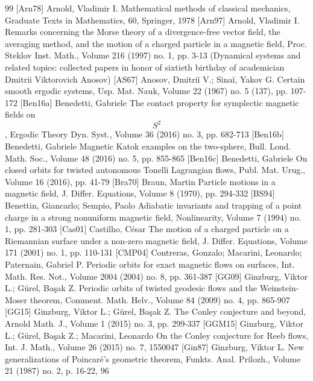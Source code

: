 \documentclass[10pt]{amsart}
\theoremstyle{definition}
\begin{document}
\begin{thebibliography}{99}
 [Arn78] Arnold, Vladimir I. Mathematical methods of classical mechanics, Graduate Texts in Mathematics, 60, Springer, 1978
 [Arn97] Arnold, Vladimir I. Remarks concerning the Morse theory of a divergence-free vector field, the averaging method, and the motion of a charged particle in a magnetic field, Proc. Steklov Inst. Math., Volume 216 (1997) no. 1, pp. 3-13 (Dynamical systems and related topics: collected papers in honor of sixtieth birthday of academician Dmitrii Viktorovich Anosov)
 [AS67] Anosov, Dmitriĭ V.; Sinaĭ, Yakov G. Certain smooth ergodic systems, Usp. Mat. Nauk, Volume 22 (1967) no. 5 (137), pp. 107-172
 [Ben16a] Benedetti, Gabriele The contact property for symplectic magnetic fields on $${S}^2$$, Ergodic Theory Dyn. Syst., Volume 36 (2016) no. 3, pp. 682-713
 [Ben16b] Benedetti, Gabriele Magnetic Katok examples on the two-sphere, Bull. Lond. Math. Soc., Volume 48 (2016) no. 5, pp. 855-865
 [Ben16c] Benedetti, Gabriele On closed orbits for twisted autonomous Tonelli Lagrangian flows, Publ. Mat. Urug., Volume 16 (2016), pp. 41-79
 [Bra70] Braun, Martin Particle motions in a magnetic field, J. Differ. Equations, Volume 8 (1970), pp. 294-332
 [BS94] Benettin, Giancarlo; Sempio, Paolo Adiabatic invariants and trapping of a point charge in a strong nonuniform magnetic field, Nonlinearity, Volume 7 (1994) no. 1, pp. 281-303
 [Cas01] Castilho, César The motion of a charged particle on a Riemannian surface under a non-zero magnetic field, J. Differ. Equations, Volume 171 (2001) no. 1, pp. 110-131
 [CMP04] Contreras, Gonzalo; Macarini, Leonardo; Paternain, Gabriel P. Periodic orbits for exact magnetic flows on surfaces, Int. Math. Res. Not., Volume 2004 (2004) no. 8, pp. 361-387
 [GG09] Ginzburg, Viktor L.; Gürel, Başak Z. Periodic orbits of twisted geodesic flows and the Weinstein-Moser theorem, Comment. Math. Helv., Volume 84 (2009) no. 4, pp. 865-907
 [GG15] Ginzburg, Viktor L.; Gürel, Başak Z. The Conley conjecture and beyond, Arnold Math. J., Volume 1 (2015) no. 3, pp. 299-337
 [GGM15] Ginzburg, Viktor L.; Gürel, Başak Z.; Macarini, Leonardo On the Conley conjecture for Reeb flows, Int. J. Math., Volume 26 (2015) no. 7, 1550047
 [Gin87] Ginzburg, Viktor L. New generalizations of Poincaré’s geometric theorem, Funkts. Anal. Prilozh., Volume 21 (1987) no. 2, p. 16-22, 96

\end{thebibliography}
\end{document}
